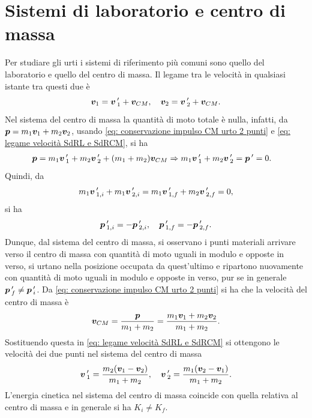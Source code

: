 \section{Sistemi di laboratorio e centro di massa}
Per studiare gli urti i sistemi di riferimento più comuni sono quello del laboratorio e quello del centro di massa. Il legame tra le velocità in qualsiasi istante tra questi due è
\begin{equation}
\label{eq: legame velocità SdRL e SdRCM}
    \bm{v}_1=\bm{v}\,'_1+\bm{v}_{CM},\quad\bm{v}_2=\bm{v}\,'_2+\bm{v}_{CM}.
\end{equation}
Nel sistema del centro di massa la quantità di moto totale è nulla, infatti, da $\bm{p}=m_1\bm{v}_1+m_2\bm{v}_2$, usando \eqref{eq: conservazione impulso CM urto 2 punti} e \eqref{eq: legame velocità SdRL e SdRCM}, si ha
\begin{equation}
    \begin{split}
            \bm{p}&=m_1\bm{v}\,'_1+m_2\bm{v}\,'_2+(m_1+m_2)\bm{v}_{CM}\Rightarrow m_1\bm{v}\,'_1+m_2\bm{v}\,'_2=\bm{p}\,'=0.
    \end{split}
\end{equation}
Quindi, da
\begin{equation}
    m_1\bm{v}\,'_{1,i}+m_1\bm{v}\,'_{2,i}=m_1\bm{v}\,'_{1,f}+m_2\bm{v}\,'_{2,f}=0,
\end{equation}
si ha
\begin{equation}
    \bm{p}\,'_{1,i}=-\bm{p}\,'_{2,i},\quad\bm{p}\,'_{1,f}=-\bm{p}\,'_{2,f}.
\end{equation}
Dunque, dal sistema del centro di massa, si osservano i punti materiali arrivare verso il centro di massa con quantità di moto uguali in modulo e opposte in verso, si urtano nella posizione occupata da quest'ultimo e ripartono nuovamente con quantità di moto uguali in modulo e opposte in verso, pur se in generale $\bm{p}\,'_f\neq\bm{p}\,'_i$. Da \eqref{eq: conservazione impulso CM urto 2 punti} si ha che la velocità del centro di massa è
\begin{equation}
\label{eq: velocità CM}
    \bm{v}_{CM}=\frac{\bm{p}}{m_1+m_2}=\frac{m_1\bm{v}_1+m_2\bm{v}_2}{m_1+m_2}.
\end{equation}
Sostituendo questa in \eqref{eq: legame velocità SdRL e SdRCM} si ottengono le velocità dei due punti nel sistema del centro di massa
\begin{equation}
\label{eq: velocità nel SdRCM}
    \bm{v}\,'_1=\frac{m_2(\bm{v}_1-\bm{v}_2)}{m_1+m_2},\quad\bm{v}\,'_2=\frac{m_1(\bm{v}_2-\bm{v}_1)}{m_1+m_2}.
\end{equation}
L'energia cinetica nel sistema del centro di massa coincide con quella relativa al centro di massa e in generale si ha $K_i\neq K_f$. 

